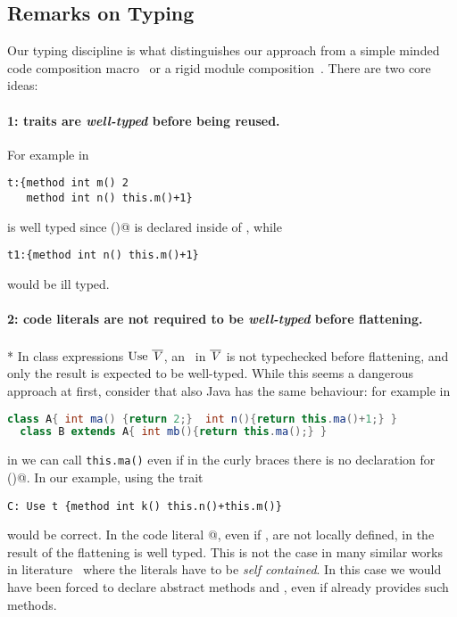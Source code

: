 \subsection{Remarks on Typing}
 Our typing discipline is 
what distinguishes our approach from a simple minded code composition macro~\cite{bawden1999quasiquotation}
or a rigid module composition~\cite{ancona2002calculus}.
There are two core ideas:

\paragraph{1: traits are \emph{well-typed} before being reused.}
 For example in

\saveSpace\begin{lstlisting}
t:{method int m() 2 
   method int n() this.m()+1}
\end{lstlisting}\saveSpace

\noindent \Q@t@ is well typed since \Q@m()@ is declared inside of \Q@t@, while

\saveSpace\begin{lstlisting}
t1:{method int n() this.m()+1} 
\end{lstlisting}\saveSpace
\noindent would be ill typed.

\paragraph{2: code literals are not required to be \emph{well-typed} before flattening.}${}_{}$\\*
In class expressions  $\use\ \overline\mV$,
an \mL\ in $\overline{\mathit{V}}$ is not typechecked before flattening, and only the result is expected to be well-typed.
While this seems a dangerous approach at first, consider that also Java has the same behaviour:
for example in
\saveSpace\begin{lstlisting}[language=Java]
  class A{ int ma() {return 2;}  int n(){return this.ma()+1;} }
  class B extends A{ int mb(){return this.ma();} }
\end{lstlisting}\saveSpace
\noindent in \Q@B@ we can call \lstinline{this.ma()} even if in the curly braces there is no declaration for \Q@ma()@.
In our example, using the trait \Q@t@

\saveSpace\begin{lstlisting}
C: Use t {method int k() this.n()+this.m()}
\end{lstlisting}\saveSpace
\noindent would be correct. In the code literal
@, 
 even if \Q@n@, \Q@m@ are not locally defined, in 
\name the result of the flattening is well typed.
This is not the case in many similar works in literature~\cite{deep,Bettini2015282,Bergel2007} where the
literals have to be \emph{self contained}. In this case we would have been forced to
declare abstract methods \Q@n@ and \Q@m@, even if \Q@t@ already 
provides such methods.


